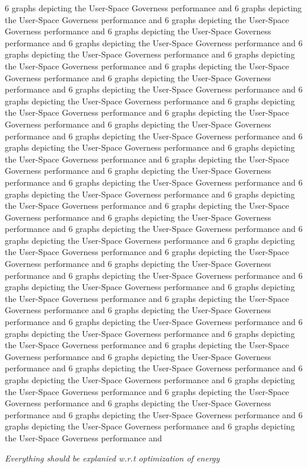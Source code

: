 6 graphs depicting the User-Space Governess performance and 
6 graphs depicting the User-Space Governess performance and 
6 graphs depicting the User-Space Governess performance and 
6 graphs depicting the User-Space Governess performance and 
6 graphs depicting the User-Space Governess performance and 
6 graphs depicting the User-Space Governess performance and 
6 graphs depicting the User-Space Governess performance and 
6 graphs depicting the User-Space Governess performance and 
6 graphs depicting the User-Space Governess performance and 
6 graphs depicting the User-Space Governess performance and 
6 graphs depicting the User-Space Governess performance and 
6 graphs depicting the User-Space Governess performance and 
6 graphs depicting the User-Space Governess performance and 
6 graphs depicting the User-Space Governess performance and 
6 graphs depicting the User-Space Governess performance and 
6 graphs depicting the User-Space Governess performance and 
6 graphs depicting the User-Space Governess performance and 
6 graphs depicting the User-Space Governess performance and 
6 graphs depicting the User-Space Governess performance and 
6 graphs depicting the User-Space Governess performance and 
6 graphs depicting the User-Space Governess performance and 
6 graphs depicting the User-Space Governess performance and 
6 graphs depicting the User-Space Governess performance and 
6 graphs depicting the User-Space Governess performance and 
6 graphs depicting the User-Space Governess performance and 
6 graphs depicting the User-Space Governess performance and 
6 graphs depicting the User-Space Governess performance and 
6 graphs depicting the User-Space Governess performance and 
6 graphs depicting the User-Space Governess performance and 
6 graphs depicting the User-Space Governess performance and 
6 graphs depicting the User-Space Governess performance and 
6 graphs depicting the User-Space Governess performance and 
6 graphs depicting the User-Space Governess performance and 
6 graphs depicting the User-Space Governess performance and 
6 graphs depicting the User-Space Governess performance and 
6 graphs depicting the User-Space Governess performance and 
6 graphs depicting the User-Space Governess performance and 
6 graphs depicting the User-Space Governess performance and 
6 graphs depicting the User-Space Governess performance and 
6 graphs depicting the User-Space Governess performance and 
6 graphs depicting the User-Space Governess performance and 
6 graphs depicting the User-Space Governess performance and 
6 graphs depicting the User-Space Governess performance and 
6 graphs depicting the User-Space Governess performance and 
6 graphs depicting the User-Space Governess performance and 
6 graphs depicting the User-Space Governess performance and 
6 graphs depicting the User-Space Governess performance and 


\emph{Everything should be explanied w.r.t optimization of energy}

